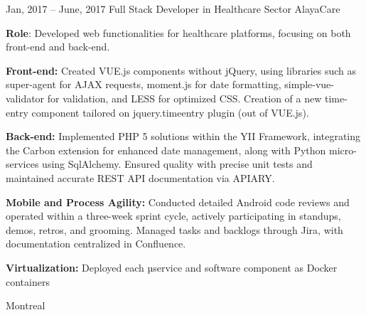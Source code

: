 \documentclass[
  a4paper,
   maincolor=cvblue,
   sectioncolor=cvblue,
   sidebarwidth=0.323\paperwidth,
]{fortysecondscv}
\begin{document}
\begin{cvtableNew}
  \cvitemRightNew
    {Jan, 2017 – June, 2017} %
    {Full Stack Developer in Healthcare Sector} %
    {AlayaCare} %
    {
      \vspace{0.1pt} %
      \textbf{Role}: Developed web functionalities for healthcare platforms, focusing on both front-end and back-end.\par
      \vspace{4pt}
      \textbf{Front-end:} Created VUE.js components without jQuery, using libraries such as super-agent for AJAX requests, moment.js for date formatting, simple-vue-validator for validation, and LESS for optimized CSS. Creation of a new time-entry component tailored on jquery.timeentry plugin (out of VUE.js).\par
      \vspace{4pt}
      \textbf{Back-end:} Implemented PHP 5 solutions within the YII Framework, integrating the Carbon extension for enhanced date management, along with Python micro-services using SqlAlchemy. Ensured quality with precise unit tests and maintained accurate REST API documentation via APIARY.\par
      \vspace{4pt}
      \textbf{Mobile and Process Agility:} Conducted detailed Android code reviews and operated within a three-week sprint cycle, actively participating in standups, demos, retros, and grooming. Managed tasks and backlogs through Jira, with documentation centralized in Confluence.\par
      \vspace{4pt}
      \textbf{Virtualization:} Deployed each µservice and software component as Docker containers\par
    }
    {Montreal} %
\end{cvtableNew}
\end{document}
